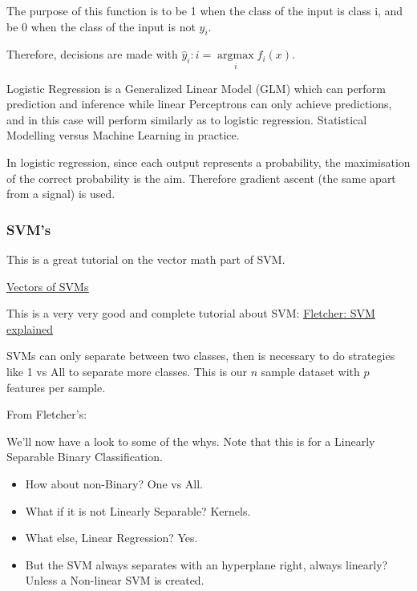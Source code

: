 The purpose of this function is to be 1 when the class of the input is class i, and be 0 when the class of the input is not $y_i$.

Therefore, decisions are made with $\hat{y}_i : i = \underset{i}{\operatorname{argmax}} f_i(x)$.

Logistic Regression is a Generalized Linear Model (GLM) which can perform prediction and inference while linear Perceptrons can only achieve predictions, and in this case will perform similarly as to logistic regression. Statistical Modelling versus Machine Learning in practice.

In logistic regression, since each output represents a probability, the maximisation of the correct probability is the aim. Therefore gradient ascent (the same apart from a signal) is used.


\subsubsection{SVM's}

This is a great tutorial on the vector math part of SVM.

\href{https://www.svm-tutorial.com/2014/11/svm-understanding-math-part-2/}{\ul{Vectors of SVMs}}

This is a very very good and complete tutorial about SVM:
\href{https://cling.csd.uwo.ca/cs860/papers/SVM_Explained.pdf}{\ul{Fletcher: SVM explained}}



SVMs can only separate between two classes, then is necessary to do strategies like 1 vs All to separate more classes. This is our $n$ sample dataset with $p$ features per sample.


From Fletcher's:


We'll now have a look to some of the whys. Note that this is for a Linearly Separable Binary Classification. 
\begin{itemize}
    \item How about non-Binary? One vs All.
    \item What if it is not Linearly Separable? Kernels.
    \item What else, Linear Regression? Yes.
    \item But the SVM always separates with an hyperplane right, always linearly? Unless a Non-linear SVM is created.
\end{itemize}


